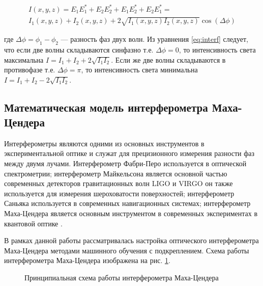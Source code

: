 \begin{multline}
    I(x, y, z) = E_1E_1^* + E_2E_2^* + E_1E_2^* + E_2E_1^* = \\
    I_1(x,y,z) + I_2(x,y,z) + 2 \sqrt{I_1(x,y,z)I_2(x,y,z)}\cos(\Delta \phi)
\label{eq:interf}
\end{multline}

где $\Delta \phi = \phi_1 - \phi_2$ --- разность фаз двух волн. Из уравнения \ref{eq:interf} следует, что если две волны складываются синфазно т.е. $\Delta \phi = 0$, то интенсивность света максимальна $I = I_1 + I_2 + 2\sqrt{I_1I_2}$. Если же две волны складываются в противофазе т.е. $\Delta \phi = \pi$, то интенсивность света минимальна $I = I_1 + I_2 - 2\sqrt{I_1I_2}$.

\subsection{Математическая модель интерферометра Маха-Цендера}\label{sec:ch2/sec1/subsec2}

Интерферометры являются одними из основных инструментов в экспериментальной оптике и служат для прецизионного измерения разности фаз между двумя лучами. Интерферометр Фабри-Перо\cite{fabry-perot1899} используется в оптической спектрометрии; интерферометр Майкельсона является основной частью современных детекторов гравитационных волн LIGO и VIRGO \cite{LIGO, VIRGO} он также используется для измерения шероховатости поверхностей; интерферометр Саньяка используется в современных навигационных системах; интерферометр Маха-Цендера является основным инструментом в современных экспериментах в квантовой оптике \cite{Sarkar2006, Sychev2017}. 

В рамках данной работы рассматривалась настройка оптического интерферометра Маха-Цендера методами машинного обучения с подкреплением. Схема работы интерферометра Маха-Цендера изображена на рис. \ref{fig:MZI}. 

\begin{figure}[ht]
\caption{Принципиальная схема работы интерферометра Маха-Цендера}
\label{fig:MZI}
\end{figure}

